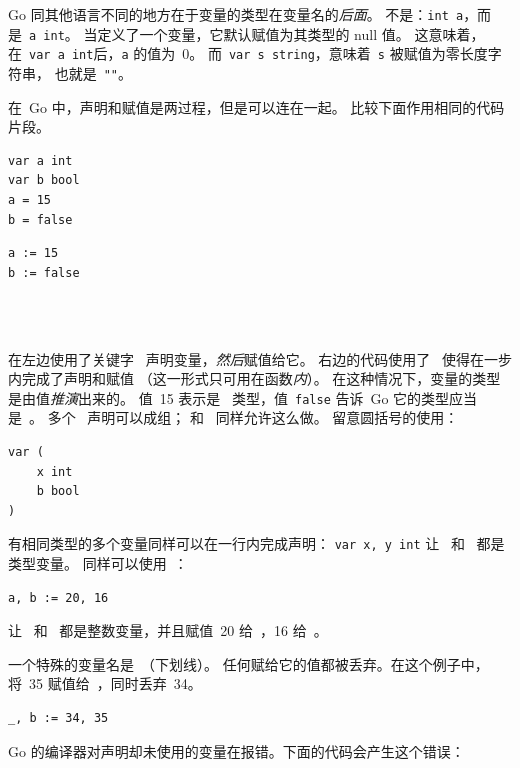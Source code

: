 Go 同其他语言不同的地方在于变量的类型在变量名的\emph{后面}。
不是：\lstinline{int a}，而是~\lstinline{a int}。
当定义了一个变量，它默认赋值为其类型的 null 值。
这意味着，在~\lstinline{var a int}后，\lstinline{a} 的值为~0。
而~\lstinline{var s string}，意味着~\lstinline{s} 被赋值为零长度字符串，
也就是~\lstinline{""}。

在~Go 中，声明和赋值是两过程，但是可以连在一起。
比较下面作用相同的代码片段。

\begin{minipage}{.5\textwidth}
\begin{lstlisting}[linewidth=.5\textwidth,caption={用 = 声明}]
var a int
var b bool
a = 15
b = false
\end{lstlisting}
\hfill
\end{minipage}
\begin{minipage}{.5\textwidth}
\begin{lstlisting}[linewidth=.5\textwidth,caption={用 := 声明}]
a := 15
b := false
\end{lstlisting}
\ \\
\ \\
\hfill
\end{minipage}

在左边使用了关键字~ 声明变量，\emph{然后}赋值给它。
右边的代码使用了~\mbox{\key{:=}{ }} 使得在一步内完成了声明和赋值
（这一形式只可用在函数\emph{内}）。
在这种情况下，变量的类型是由值\emph{推演}出来的。
值~15 表示是~ 类型，值~\texttt{false} 告诉~Go 它的类型应当是~。
多个~ 声明可以成组； 和~ 同样允许这么做。
留意圆括号的使用：
\begin{lstlisting}
var (
    x int
    b bool
)
\end{lstlisting}

有相同类型的多个变量同样可以在一行内完成声明：
\lstinline{var x, y int} 让~ 和~ 都是~ 类型变量。
同样可以使用~：
\begin{lstlisting}
a, b := 20, 16
\end{lstlisting}
让~ 和~ 都是整数变量，并且赋值~20 给~，16 给~。

一个特殊的变量名是~\var{\textbf{\_}}（下划线）。
任何赋给它的值都被丢弃。在这个例子中，将~35 赋值给~，同时丢弃~34。
\begin{lstlisting}
_, b := 34, 35
\end{lstlisting}
Go 的编译器对声明却未使用的变量在报错。下面的代码会产生这个错误：

